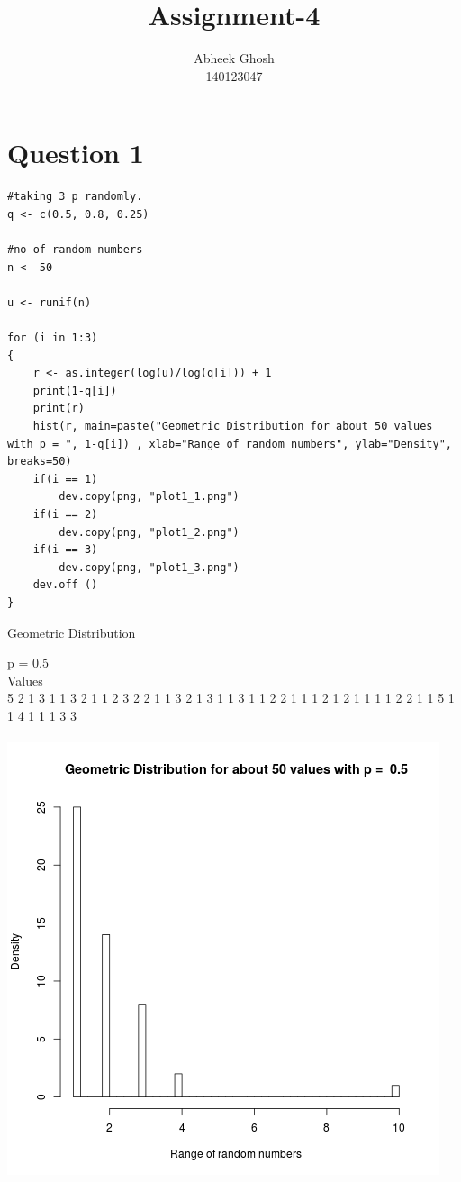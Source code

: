 \documentclass{article}
\begin{document}
	\title{\textbf{Assignment-4}}
	\author{Abheek Ghosh \\ 
		140123047 }
	
	\maketitle
	

\section{Question 1}


\begin{lstlisting}
#taking 3 p randomly.
q <- c(0.5, 0.8, 0.25)

#no of random numbers
n <- 50

u <- runif(n)

for (i in 1:3)
{
	r <- as.integer(log(u)/log(q[i])) + 1
	print(1-q[i])
	print(r)
	hist(r, main=paste("Geometric Distribution for about 50 values with p = ", 1-q[i]) , xlab="Range of random numbers", ylab="Density", breaks=50)
	if(i == 1)
		dev.copy(png, "plot1_1.png")
	if(i == 2)
		dev.copy(png, "plot1_2.png")
	if(i == 3)
		dev.copy(png, "plot1_3.png")
	dev.off ()
}
\end{lstlisting}
\pagebreak

Geometric Distribution

p = 0.5\\
Values\\
5 2 1 3 1 1 3 2 1 1 2 3 2 2 1 1 3 2 1 3 1 1 3 1 1 2 2 1 1 1 2 1 2 1 1 1 1 2
2 1 1 5 1 1 4 1 1 1 3 3\\\\
\includegraphics{"plot1_1"}
\pagebreak
\end{document}
